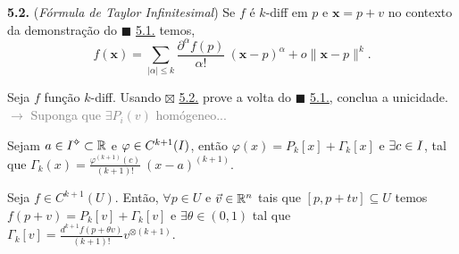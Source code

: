 \begin{corollary}[]%
\hypertarget{coro52}{}
    \textbf{5.2.} (\emph{Fórmula de Taylor Infinitesimal}) Se \(f\) é \(k\)-diff em \(p\) e  \(\textbf{x}=p+v\) no contexto da demonstração do \(\blacksquare\) \hyperlink{thm51}{5.1.} temos,
    \[f(\textbf{x}) = \sum_{|\alpha|\leq k}\frac{\partial^\alpha f (p)}{\alpha !} \ (\textbf{x}-p)^\alpha + o\|\textbf{x}-p\|^k. \]
\end{corollary}    

\begin{exercise}
    Seja \(f\) função \(k\)-diff. Usando {\scriptsize \(\boxtimes\)} \hyperlink{coro52}{5.2.} prove a volta do \(\blacksquare\) \hyperlink{thm51}{5.1.}, conclua a unicidade. \textcolor{gray}{\(\rightarrow\) Suponga que \(\exists P_i(v)\) homógeneo... }
\end{exercise}

\begin{proposition}
    Sejam \(a \in \I\ab\subset \R\) e \(\varphi \in C^{k+1}(I)\), então \(\varphi (x) = P_k[x] + \Gamma_k[x]\) e \( \exists c \in I\), tal que \(\Gamma_k(x) = \frac{\varphi^{(k+1)}(c)}{(k+1)!} \ (x-a)^{(k+1)}\). 
\end{proposition}

\begin{corollary}
    Seja \(f\in C^{k+1}(U)\). Então, \(\forall p\in U\) e \(\vec{v}\in \mathbb{R}^n\) tais que \([p,p+tv]\subseteq U\) temos \(f(p+v) = P_k[v] + \Gamma_k[v]\) e \(\exists \theta \in (0,1)\) tal que \(\Gamma_k[v] = \frac{d^{k+1}f(p+\theta v)}{(k+1)!}  v^{\otimes (k+1)}\). 
\end{corollary}
